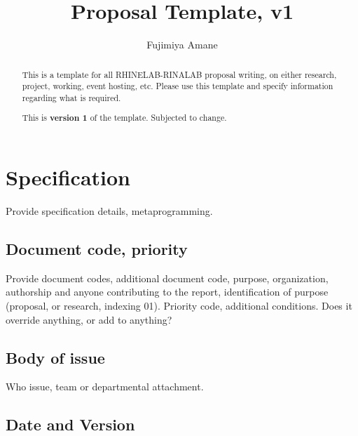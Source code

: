 \documentclass[10pt,a4paper]{article}
\title{\textbf{Proposal Template}, v1} %
\author{Fujimiya Amane} %
\affiliation{} %
\begin{document}
\maketitle

\begin{abstract}
    \noindent
    This is a template for all RHINELAB-RINALAB proposal writing, on either research, project, working, event hosting, etc. Please use this template and specify information regarding what is required.
    
    This is \textbf{version 1} of the template. Subjected to change. 

\end{abstract}

\vspace{2.5cm}



\thispagestyle{firstpage}

\pagebreak


\newgeometry{} %

\setcounter{section}{-1}

\section{Specification}
\label{sec:spec}

Provide specification details, metaprogramming. 

\subsection{Document code, priority}

Provide document codes, additional document code, purpose, organization, authorship and anyone contributing to the report, identification of purpose (proposal, or research, indexing 01). Priority code, additional conditions. Does it override anything, or add to anything?

\subsection{Body of issue}

Who issue, team or departmental attachment. 

\subsection{Date and Version}
\end{document}
